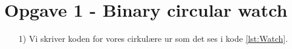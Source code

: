 \section{Opgave 1 - Binary circular watch}
\begin{enumerate}
	\item[1)]
	Vi skriver koden for vores cirkulære ur som det ses i kode \ref{lst:Watch}.\\
	\begin{lstlisting}[caption={VHDL code for binary circular watch},label={lst:Watch}]
	
	
	\end{lstlisting}
\end{enumerate}